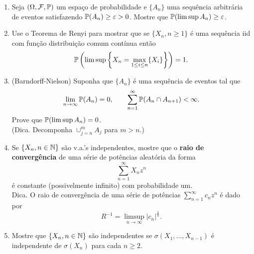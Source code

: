 \begin{enumerate}[leftmargin=*]
\item Seja $(\Omega,\F,\P)$ um espaço de probabilidade e 
$\{A_n\}$ uma sequência arbitrária de eventos satisfazendo 
$\P(A_n)\geq \varepsilon>0$.
Mostre que $\P(\limsup A_n)\geq \varepsilon$.








\item 
Use o Teorema de Renyi para mostrar que se 
$\{X_n, n\geq 1\}$ é uma sequência iid com função distribuição
comum contínua então 
	\[
		\P\left( \limsup \left\{ X_n = \max_{1\leq i\leq n}\{X_i\}\right\} \right)
		=1.
	\]






\item 
(Barndorff-Nielson) Suponha que $\{A_n\}$ é uma sequência
de eventos tal que 
\[
	\lim_{n\to\infty} \P(A_n)=0,
	\qquad
	\sum_{n=1}^{\infty} \P(A_n\cap A_{n+1})<\infty.
\]
Prove que $\P(\limsup A_n)=0$. 
\\
(Dica. Decomponha $\cup_{j=n}^m A_j$ para $m>n$.)














\item 
Se $\{X_n, n\in\N\}$ são v.a.'s independentes, mostre que
o {\bf raio de convergência} de uma série de potências aleatória 
da forma 
	\[
		\sum_{n=1}^{\infty} X_n z^n
	\]
é constante (possivelmente infinito) com probabilidade um.
\\
Dica. O raio de convergência de uma série de potências 
$\sum_{n=1}^{\infty} c_nz^n$ é dado por 
	\[
		R^{-1} = \limsup_{n\to\infty} |c_n|^{\frac{1}{n}}.
	\]





\item 
Mostre que $\{X_n, n\in\N\}$ são independentes se 
$\sigma(X_1,\ldots,X_{n-1})$ 
é independente de $\sigma(X_n)$ para cada $n\geq 2$.










\end{enumerate}
